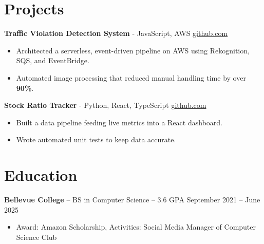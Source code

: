 \documentclass[11pt]{article}
\begin{document}

\vspace{-18.5pt}

\section*{Projects}

\textbf{Traffic Violation Detection System}{ - JavaScript, AWS} \hfill \href{https://github.com/Monica20030707/AWS_rekonigition-N-read-database}{github.com} \\
\vspace{-9pt}
\begin{itemize}
  \item Architected a serverless, event-driven pipeline on AWS using Rekognition, SQS, and EventBridge.
  \item Automated image processing that reduced manual handling time by over \textbf{90\%}.
\end{itemize}

\textbf{Stock Ratio Tracker}{ - Python, React, TypeScript} \hfill \href{https://github.com/Monica20030707/Trading-Dashboard_UI}{github.com} \\
\vspace{-9pt}
\begin{itemize}
  \item Built a data pipeline feeding live metrics into a React dashboard.
  \item Wrote automated unit tests to keep data accurate.
\end{itemize}

\vspace{-18.5pt}

\section*{Education}
\textbf{Bellevue College} -- BS in Computer Science -- 3.6 GPA \hfill September 2021 -- June 2025\\
\vspace{-9pt}
\begin{itemize}
  \item Award: Amazon Scholarship, Activities: Social Media Manager of Computer Science Club
\end{itemize}
\end{document}
